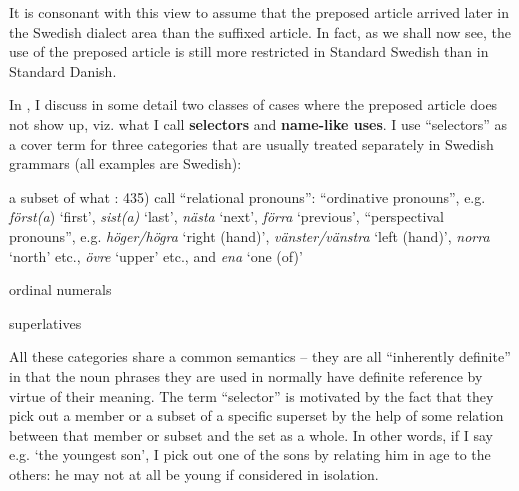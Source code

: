 It is consonant with this view to assume that the preposed article arrived later in the Swedish dialect area than the suffixed article. In fact, as we shall now see, the use of the preposed article is still more restricted in Standard Swedish than in Standard Danish. 


In \citet{Dahl2003}, I discuss in some detail two classes of cases where the preposed article does not show up, viz. what I call \textbf{selectors} and \textbf{name-like uses}. I use “selectors” as a cover term for three categories that are usually treated separately in Swedish grammars (all examples are Swedish):


\item 

a subset of what \citet{TelemanEtAl1999}: 435) call “relational pronouns”: “ordinative pronouns”, e.g. \textit{först(a}) ‘first’, \textit{sist(a)} ‘last’, \textit{nästa} ‘next’, \textit{förra }‘previous’, “perspectival pronouns”, e.g. \textit{höger/högra }‘right (hand)’, \textit{vänster/vänstra} ‘left (hand)’, \textit{norra} ‘north’ etc., \textit{övre} ‘upper’ etc., and \textit{ena} ‘one (of)’ 


\item 

ordinal numerals


\item 

superlatives



All these categories share a common semantics – they are all “inherently definite” in that the noun phrases they are used in normally have definite reference by virtue of their meaning. The term “selector” is motivated by the fact that they pick out a member or a subset of a specific superset by the help of some relation between that member or subset and the set as a whole. In other words, if I say e.g.  ‘the youngest son’, I pick out one of the sons by relating him in age to the others: he may not at all be young if considered in isolation. 

